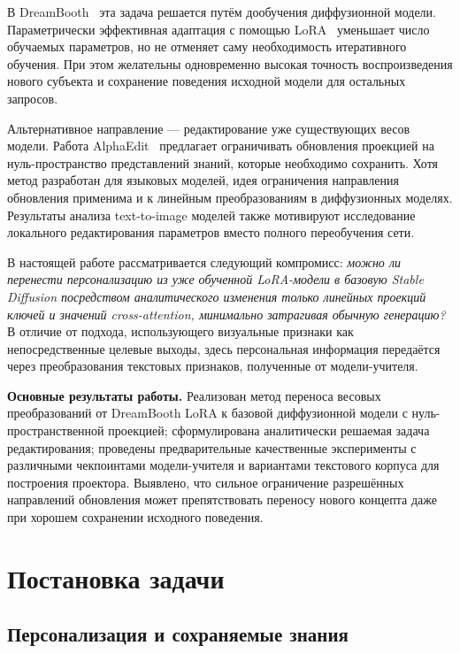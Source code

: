 \documentclass{article}
\begin{document}
В DreamBooth~\citep{ruiz2023dreambooth} эта задача решается путём
дообучения диффузионной модели. Параметрически эффективная адаптация с помощью
LoRA~\citep{hu2022lora} уменьшает число обучаемых параметров, но не отменяет
саму необходимость итеративного обучения. При этом желательны одновременно
высокая точность воспроизведения нового субъекта и сохранение поведения
исходной модели для остальных запросов.

Альтернативное направление --- редактирование уже существующих весов модели.
Работа AlphaEdit~\citep{fang2025alphaedit} предлагает ограничивать
обновления проекцией на нуль-пространство представлений знаний, которые
необходимо сохранить. Хотя метод разработан для языковых моделей,
идея ограничения направления обновления применима и к линейным преобразованиям
в диффузионных моделях. Результаты анализа text-to-image моделей
\citep{basu2023localizing} также мотивируют исследование локального
редактирования параметров вместо полного переобучения сети.

В настоящей работе рассматривается следующий компромисс: 
\emph{можно ли перенести персонализацию из уже обученной LoRA-модели в
базовую Stable Diffusion посредством аналитического изменения только
линейных проекций ключей и значений cross-attention, минимально затрагивая
обычную генерацию?} В отличие от подхода, использующего визуальные признаки
как непосредственные целевые выходы, здесь персональная информация передаётся
через преобразования текстовых признаков, полученные от модели-учителя.

\textbf{Основные результаты работы.}
Реализован метод переноса весовых преобразований от DreamBooth LoRA к базовой
диффузионной модели с нуль-пространственной проекцией; сформулирована
аналитически решаемая задача редактирования; проведены предварительные
качественные эксперименты с различными чекпоинтами модели-учителя и
вариантами текстового корпуса для построения проектора. Выявлено, что
сильное ограничение разрешённых направлений обновления может препятствовать
переносу нового концепта даже при хорошем сохранении исходного поведения.

\section{Постановка задачи}\label{sec:problem}

\subsection{Персонализация и сохраняемые знания}
\end{document}
